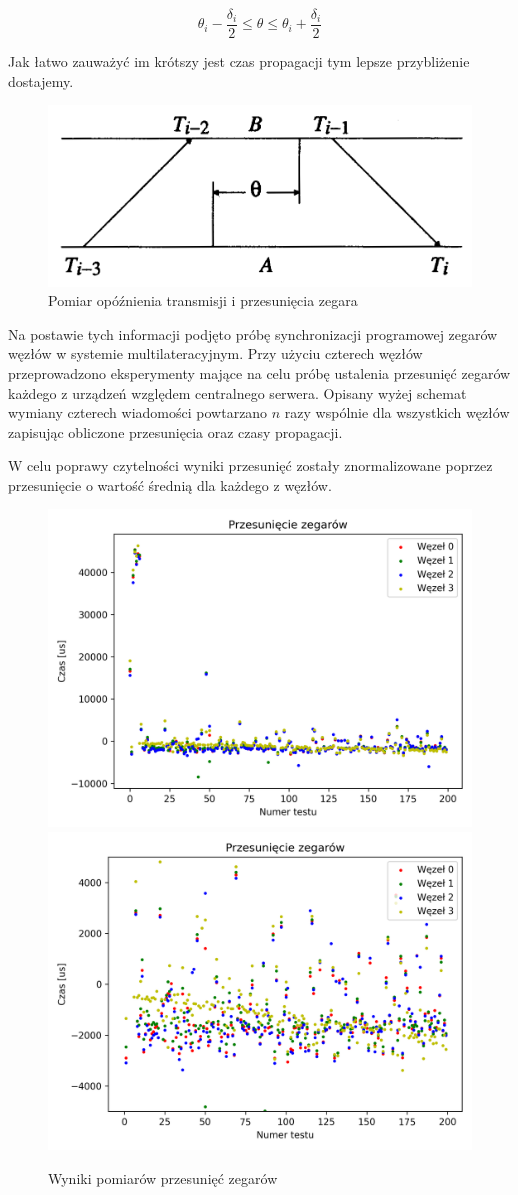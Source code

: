 \[\theta_i - \frac{\delta_i}{2} \leq \theta \leq \theta_i + \frac{\delta_i}{2}\]

Jak łatwo zauważyć im krótszy jest czas propagacji tym lepsze przybliżenie dostajemy.

\begin{figure}[h]
    \includegraphics[width=\textwidth]{pics/ntp.png}
\caption{Pomiar opóźnienia transmisji i przesunięcia zegara}
\label{fig:ntp}
\end{figure}

Na postawie tych informacji podjęto próbę synchronizacji programowej zegarów węzłów w systemie multilateracyjnym. Przy użyciu czterech węzłów przeprowadzono eksperymenty mające na celu próbę ustalenia przesunięć zegarów każdego z urządzeń względem centralnego serwera. Opisany wyżej schemat wymiany czterech wiadomości powtarzano $n$ razy wspólnie dla wszystkich węzłów zapisując obliczone przesunięcia oraz czasy propagacji.

W celu poprawy czytelności wyniki przesunięć zostały znormalizowane poprzez przesunięcie o wartość średnią dla każdego z węzłów.

\begin{figure}[h]
\centering
    \includegraphics[width=.49\textwidth]{pics/ntp_sync/offsets.png}
    \includegraphics[width=.49\textwidth]{pics/ntp_sync/offsets_close.png}
\caption{Wyniki pomiarów przesunięć zegarów}
\label{pic:offsets_ntp}
\end{figure}


